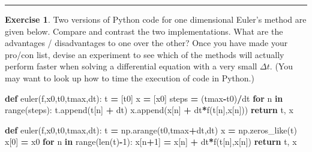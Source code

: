 \documentclass[
]{book}
\newenvironment{Shaded}{\begin{snugshade}}{\end{snugshade}}
\newcommand{\BuiltInTok}[1]{#1}
\newcommand{\ControlFlowTok}[1]{\textcolor[rgb]{0.13,0.29,0.53}{\textbf{#1}}}
\newcommand{\DecValTok}[1]{\textcolor[rgb]{0.00,0.00,0.81}{#1}}
\newcommand{\KeywordTok}[1]{\textcolor[rgb]{0.13,0.29,0.53}{\textbf{#1}}}
\newcommand{\NormalTok}[1]{#1}
\newcommand{\OperatorTok}[1]{\textcolor[rgb]{0.81,0.36,0.00}{\textbf{#1}}}
\theoremstyle{definition}
\theoremstyle{definition}
\theoremstyle{definition}
\newtheorem{exercise}{Exercise}[chapter]
\theoremstyle{remark}
\begin{document}
\begin{center}\rule{0.5\linewidth}{0.5pt}\end{center}

\begin{exercise}
\protect\hypertarget{exr:unnamed-chunk-497}{}{\label{exr:unnamed-chunk-497} }Two versions of Python code for one dimensional Euler's method are given below. Compare and contrast the two implementations. What are the advantages / disadvantages to one over the other? Once you have made your pro/con list, devise an experiment to see which of the methods will actually perform faster when solving a differential equation with a very small \(\Delta t\). (You may want to look up how to time the execution of code in Python.)
\end{exercise}

\begin{Shaded}
\begin{Highlighting}[]
\KeywordTok{def}\NormalTok{ euler(f,x0,t0,tmax,dt):}
\NormalTok{    t }\OperatorTok{=}\NormalTok{ [t0]}
\NormalTok{    x }\OperatorTok{=}\NormalTok{ [x0]}
\NormalTok{    steps }\OperatorTok{=}\NormalTok{ (tmax}\OperatorTok{{-}}\NormalTok{t0)}\OperatorTok{/}\NormalTok{dt}
    \ControlFlowTok{for}\NormalTok{ n }\KeywordTok{in} \BuiltInTok{range}\NormalTok{(steps):}
\NormalTok{        t.append(t[n] }\OperatorTok{+}\NormalTok{ dt)}
\NormalTok{        x.append(x[n] }\OperatorTok{+}\NormalTok{ dt}\OperatorTok{*}\NormalTok{f(t[n],x[n]))}
    \ControlFlowTok{return}\NormalTok{ t, x}
\end{Highlighting}
\end{Shaded}

\begin{Shaded}
\begin{Highlighting}[]
\KeywordTok{def}\NormalTok{ euler(f,x0,t0,tmax,dt):}
\NormalTok{    t }\OperatorTok{=}\NormalTok{ np.arange(t0,tmax}\OperatorTok{+}\NormalTok{dt,dt)}
\NormalTok{    x }\OperatorTok{=}\NormalTok{ np.zeros\_like(t)}
\NormalTok{    x[}\DecValTok{0}\NormalTok{] }\OperatorTok{=}\NormalTok{ x0}
    \ControlFlowTok{for}\NormalTok{ n }\KeywordTok{in} \BuiltInTok{range}\NormalTok{(}\BuiltInTok{len}\NormalTok{(t)}\OperatorTok{{-}}\DecValTok{1}\NormalTok{):}
\NormalTok{        x[n}\OperatorTok{+}\DecValTok{1}\NormalTok{] }\OperatorTok{=}\NormalTok{ x[n] }\OperatorTok{+}\NormalTok{ dt}\OperatorTok{*}\NormalTok{f(t[n],x[n])}
    \ControlFlowTok{return}\NormalTok{ t, x}
\end{Highlighting}
\end{Shaded}
\end{document}
